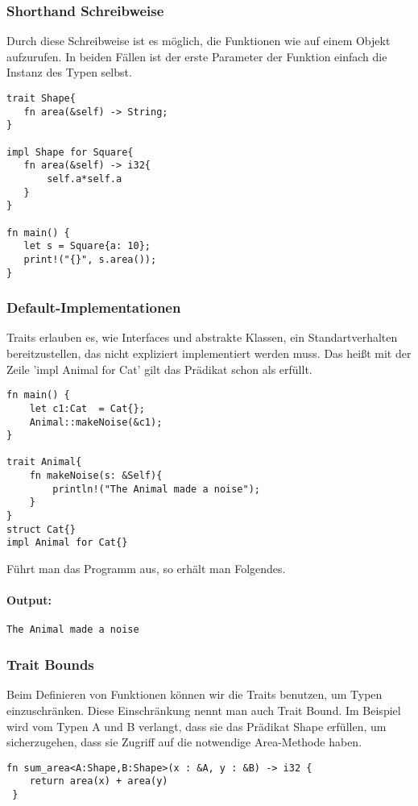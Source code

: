 \documentclass[a4paper, 1ppt]{article}
\begin{document}
\subsubsection{Shorthand Schreibweise}
Durch diese Schreibweise ist es möglich, die Funktionen wie auf einem Objekt aufzurufen. In beiden Fällen ist der erste Parameter der Funktion einfach die Instanz des Typen selbst.
\begin{verbatim}
trait Shape{
   fn area(&self) -> String;
}

impl Shape for Square{
   fn area(&self) -> i32{
       self.a*self.a
   }
}

fn main() {
   let s = Square{a: 10};
   print!("{}", s.area());
}
\end{verbatim}
\subsubsection{Default-Implementationen}
Traits erlauben es, wie Interfaces und abstrakte Klassen, ein Standartverhalten bereitzustellen, das nicht expliziert implementiert werden muss.
Das heißt mit der Zeile 'impl Animal for Cat{}' gilt das Prädikat schon als erfüllt.
\begin{verbatim}
fn main() {
    let c1:Cat  = Cat{};
    Animal::makeNoise(&c1);
}

trait Animal{
    fn makeNoise(s: &Self){
        println!("The Animal made a noise");
    }
}
struct Cat{}
impl Animal for Cat{}
\end{verbatim}
Führt man das Programm aus, so erhält man Folgendes.
\paragraph{Output:}
\begin{verbatim}
The Animal made a noise
\end{verbatim}
\subsubsection{Trait Bounds}
Beim Definieren von Funktionen können wir die Traits benutzen, um Typen einzuschränken. Diese Einschränkung nennt man auch Trait Bound.
Im Beispiel wird vom Typen A und B  verlangt, dass sie das Prädikat Shape erfüllen, um sicherzugehen, dass sie Zugriff auf die notwendige Area-Methode haben.
\begin{verbatim}
fn sum_area<A:Shape,B:Shape>(x : &A, y : &B) -> i32 {
    return area(x) + area(y)
 }
\end{verbatim}
\end{document}
